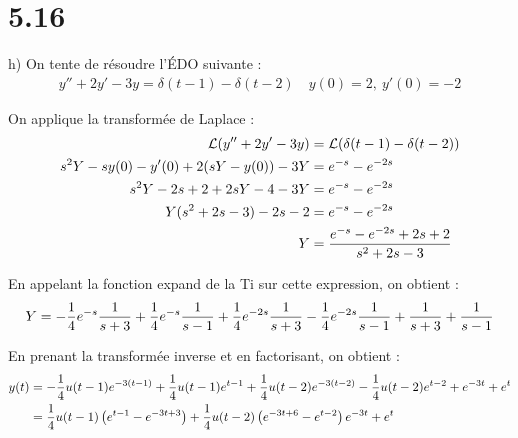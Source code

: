 \section*{5.16}

h) On tente de résoudre l'ÉDO suivante :
\begin{align*}
    y'' + 2y' -3y = \delta(t-1) - \delta(t-2)\quad y(0)=2,\ y'(0)=-2
\end{align*}

On applique la transformée de Laplace :
\begin{align*}
    \mathcal{L}{\left({y'' + 2y' - 3y}\right)} &= \mathcal{L}{\left({\delta(t-1) - \delta(t-2)}\right)} \\
    s^2Y - sy(0) - y'(0) + 2(sY - y(0)) - 3Y &= e^{-s}-e^{-2s} \\
    s^2Y -2s + 2 +2sY -4 -3Y &= e^{-s}-e^{-2s} \\
    Y(s^2 + 2s - 3) -2s -2 &= e^{-s}-e^{-2s} \\
    Y &= \dfrac{e^{-s}-e^{-2s} +2s +2}{s^2 + 2s - 3}
\end{align*}

En appelant la fonction expand de la Ti sur cette expression, on obtient :
\begin{align*}
    Y = -\dfrac{1}{4}e^{-s}\dfrac{1}{s+3}+\dfrac{1}{4}e^{-s}\dfrac{1}{s-1}
    +\dfrac{1}{4}e^{-2s}\dfrac{1}{s+3}-\dfrac{1}{4}e^{-2s}\dfrac{1}{s-1}
    +\dfrac{1}{s+3} +\dfrac{1}{s-1}
\end{align*}

En prenant la transformée inverse et en factorisant, on obtient :
\begin{align*}
    y(t) &= -\dfrac{1}{4}u(t-1)e^{-3(t-1)}+\dfrac{1}{4}u(t-1)e^{t-1}
    +\dfrac{1}{4}u(t-2)e^{-3(t-2)}-\dfrac{1}{4}u(t-2)e^{t-2} + e^{-3t}+e^{t} \\
    &= \dfrac{1}{4}u(t-1)\left({e^{t-1}-e^{-3t+3}}\right) +\dfrac{1}{4}u(t-2)\left({e^{-3t+6}-e^{t-2}}\right)
    e^{-3t}+e^{t}
\end{align*}
